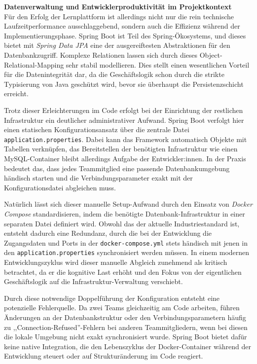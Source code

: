 \vspace{0.7cm}
\textbf{Datenverwaltung und Entwicklerproduktivität im Projektkontext} \\
Für den Erfolg der Lernplattform ist allerdings nicht nur die rein technische Laufzeitperformance ausschlaggebend, sondern auch die Effizienz während der Implementierungsphase. Spring Boot ist Teil des Spring-Ökosystems, und dieses bietet mit \textit{Spring Data JPA} eine der ausgereiftesten Abstraktionen für den Datenbankzugriff. Komplexe Relationen lassen sich durch dieses Object-Relational-Mapping sehr stabil modellieren. Dies stellt einen wesentlichen Vorteil für die Datenintegrität dar, da die Geschäftslogik schon durch die strikte Typisierung von Java geschützt wird, bevor sie überhaupt die Persistenzschicht erreicht.

Trotz  dieser Erleichterungen im Code erfolgt bei der Einrichtung der restlichen Infrastruktur ein deutlicher administrativer Aufwand. Spring Boot verfolgt hier einen statischen Konfigurationsansatz über die zentrale Datei \texttt{application.properties}. Dabei kann das Framework automatisch Objekte mit Tabellen verknüpfen, das Bereitstellen der benötigten Infrastruktur wie einen MySQL-Container bleibt allerdings Aufgabe der Entwickler:innen. In der Praxis bedeutet das, dass jedes Teammitglied eine passende Datenbankumgebung händisch starten und die Verbindungsparameter exakt mit der Konfigurationsdatei abgleichen muss.

Natürlich lässt sich dieser manuelle Setup-Aufwand durch den Einsatz von \textit{Docker Compose} standardisieren, indem die benötigte Datenbank-Infrastruktur in einer separaten Datei definiert wird. Obwohl das der aktuelle Industriestandard ist, entsteht dadurch eine Redundanz, durch die bei der Entwicklung die Zugangsdaten und Ports in der \texttt{docker-compose.yml} stets händisch mit jenen in den \texttt{application.properties} synchronisiert werden müssen. In einem modernen Entwicklungszyklus wird dieser manuelle Abgleich zunehmend als kritisch betrachtet, da er die kognitive Last erhöht und den Fokus von der eigentlichen Geschäftslogik auf die Infrastruktur-Verwaltung verschiebt.  \cite{ThoughtWorksRadar}

Durch diese notwendige Doppelführung der Konfiguration entsteht eine potenzielle Fehlerquelle. Da zwei Teams gleichzeitig am Code arbeiten, führen Änderungen an der Datenbankstruktur oder den Verbindungsparametern häufig zu ,,Connection-Refused''-Fehlern bei anderen Teammitgliedern, wenn bei diesen die lokale Umgebung nicht exakt synchronisiert wurde. Spring Boot bietet dafür keine native Integration, die den Lebenszyklus der Docker-Container während der Entwicklung steuert oder auf Strukturänderung im Code reagiert. \cite{InnoQAnnotations}


